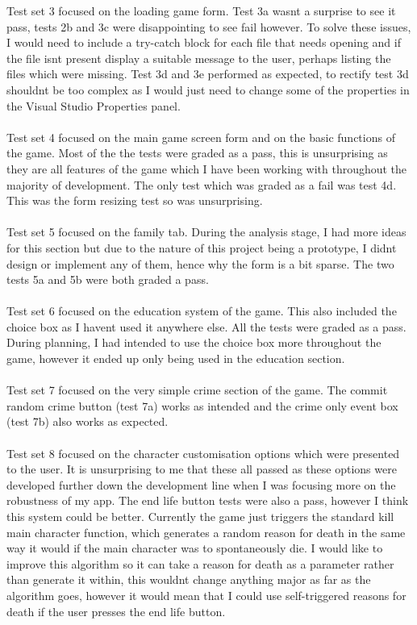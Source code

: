 Test set 3 focused on the loading game form. Test 3a wasn\textquotesingle t a surprise to see it pass, tests 2b and 3c were disappointing to see fail however. To solve these issues, I would need to include a try-catch block for each file that needs opening and if the file isn\textquotesingle t present display a suitable message to the user, perhaps listing the files which were missing. Test 3d and 3e performed as expected, to rectify test 3d shouldn\textquotesingle t be too complex as I would just need to change some of the properties in the Visual Studio Properties panel.\\ \\
Test set 4 focused on the main game screen form and on the basic functions of the game. Most of the the tests were graded as a pass, this is unsurprising as they are all features of the game which I have been working with throughout the majority of development. The only test which was graded as a fail was test 4d. This was the form resizing test so was unsurprising. \\ \\
Test set 5 focused on the family tab. During the analysis stage, I had more ideas for this section but due to the nature of this project being a prototype, I didn\textquotesingle t design or implement any of them, hence why the form is a bit sparse. The two tests 5a and 5b were both graded a pass. \\ \\
Test set 6 focused on the education system of the game. This also included the choice box as I haven\textquotesingle t used it anywhere else. All the tests were graded as a pass. During planning, I had intended to use the choice box more throughout the game, however it ended up only being used in the education section. \\ \\
Test set 7 focused on the very simple crime section of the game. The commit random crime button (test 7a) works as intended and the crime only event box (test 7b) also works as expected. \\ \\
Test set 8 focused on the character customisation options which were presented to the user. It is unsurprising to me that these all passed as these options were developed further down the development line when I was focusing more on the robustness of my app. The end life button tests were also a pass, however I think this system could be better. Currently the game just triggers the standard kill main character function, which generates a random reason for death in the same way it would if the main character was to spontaneously die. I would like to improve this algorithm so it can take a reason for death as a parameter rather than generate it within, this wouldn\textquotesingle t change anything major as far as the algorithm goes, however it would mean that I could use self-triggered reasons for death if the user presses the end life button.\\ \\
